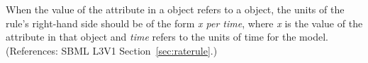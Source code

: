 When the value of the attribute  in a \RateRule object
refers to a \Compartment object, the units of the rule's right-hand side
should be of the form \emph{x per time}, where \emph{x} is the value of the
 attribute in that \Compartment object and \emph{time} refers
to the units of time for the model.  (References: SBML L3V1
Section~\ref{sec:raterule}.)

